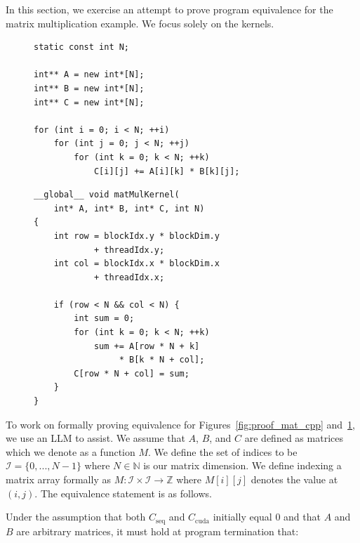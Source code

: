 \documentclass{article}
\begin{document}
In this section, we exercise an attempt to prove program equivalence for the matrix multiplication example. We focus solely on the kernels.

\begin{figure}[H]
\noindent%
\begin{minipage}[t]{0.49\textwidth}
\begin{verbatim}
static const int N;

int** A = new int*[N];
int** B = new int*[N];
int** C = new int*[N];

for (int i = 0; i < N; ++i)
    for (int j = 0; j < N; ++j)
        for (int k = 0; k < N; ++k)
            C[i][j] += A[i][k] * B[k][j];
\end{verbatim}
    \label{fig:proof_mat_cpp}
\end{minipage}%
\hfill%
\begin{minipage}[t]{0.49\textwidth}
\begin{verbatim}
__global__ void matMulKernel(
    int* A, int* B, int* C, int N)
{
    int row = blockIdx.y * blockDim.y
            + threadIdx.y;
    int col = blockIdx.x * blockDim.x
            + threadIdx.x;

    if (row < N && col < N) {
        int sum = 0;
        for (int k = 0; k < N; ++k)
            sum += A[row * N + k]
                 * B[k * N + col];
        C[row * N + col] = sum;
    }
}
\end{verbatim}
    \label{fig:proof_mat_cuda}
\end{minipage}
\end{figure}

To work on formally proving equivalence for Figures~\ref{fig:proof_mat_cpp} and~\ref{fig:proof_mat_cuda}, we use an LLM to assist. We assume that $A$, $B$, and $C$ are defined as matrices which we denote as a function $M$. We define the set of indices to be $\mathcal{I} = \{0,..., N-1\}$ where $N \in \mathbb{N}$ is our matrix dimension. We define indexing a matrix array formally as $M: \mathcal{I} \times \mathcal{I} \rightarrow \mathbb{Z}$ where $M[i][j]$ denotes the value at $(i,j)$.  The equivalence statement is as follows.

Under the assumption that both $C_{\text{seq}}$ and $C_{\text{cuda}}$ initially equal $0$ and that $A$ and $B$ are arbitrary matrices, it must hold at program termination that: 
\end{document}
